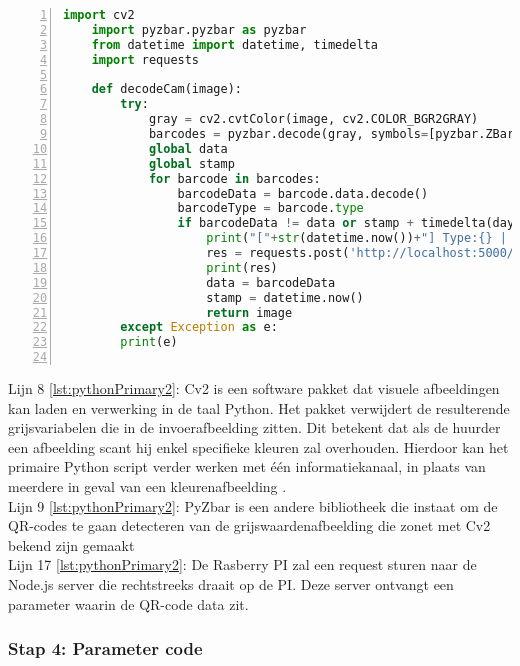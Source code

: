   \begin{lstlisting}[language=Python, caption={Het primaire uitvoerbare script van de QR-unit.}, label={lst:pythonPrimary2}, numbers=left]
    import cv2
    import pyzbar.pyzbar as pyzbar
    from datetime import datetime, timedelta
    import requests
        
    def decodeCam(image):
        try:
            gray = cv2.cvtColor(image, cv2.COLOR_BGR2GRAY)
            barcodes = pyzbar.decode(gray, symbols=[pyzbar.ZBarSymbol.QRCODE])
            global data
            global stamp
            for barcode in barcodes:
                barcodeData = barcode.data.decode()
                barcodeType = barcode.type
                if barcodeData != data or stamp + timedelta(days=0, seconds=5) < datetime.now():
                    print("["+str(datetime.now())+"] Type:{} | Data: {}".format(barcodeType, barcodeData))
                    res = requests.post('http://localhost:5000/qr-code', json = {'tag': barcodeData })
                    print(res)
                    data = barcodeData
                    stamp = datetime.now()
                    return image
        except Exception as e:
        print(e)
    
\end{lstlisting}

Lijn 8 \ref{lst:pythonPrimary2}: Cv2 is een software pakket dat visuele afbeeldingen kan laden en verwerking in de taal Python. Het pakket verwijdert de resulterende grijsvariabelen die in de invoerafbeelding zitten. Dit betekent dat als de huurder een afbeelding scant hij enkel specifieke kleuren zal overhouden. Hierdoor kan het primaire Python script verder werken met één informatiekanaal, in plaats van meerdere in geval van een kleurenafbeelding \autocite{developmentteam}.\\
Lijn 9 \ref{lst:pythonPrimary2}: PyZbar is een andere bibliotheek die instaat om de QR-codes te gaan detecteren van de grijswaardenafbeelding die zonet met Cv2 bekend zijn gemaakt \autocite{Huang2022}\\
Lijn 17 \ref{lst:pythonPrimary2}: De Rasberry PI zal een request sturen naar de Node.js server die rechtstreeks draait op de PI. Deze server ontvangt een parameter waarin de QR-code data zit.\\


\subsubsection{Stap 4: Parameter code}

